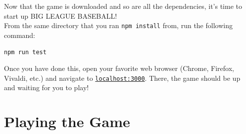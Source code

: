 \documentclass[12pt,a4paper]{report}
\begin{document}
Now that the game is downloaded and so are all the dependencies, it's time to start up BIG LEAGUE BASEBALL!\\
From the same directory that you ran \texttt{npm install} from, run the following command:
\begin{displayquote}
	\texttt{npm run test}
\end{displayquote}
Once you have done this, open your favorite web browser (Chrome, Firefox, Vivaldi, etc.) and navigate to \href{http://localhost:3000}{\texttt{localhost:3000}}. There, the game should be up and waiting for you to play!

\chapter{Playing the Game}
\end{document}
